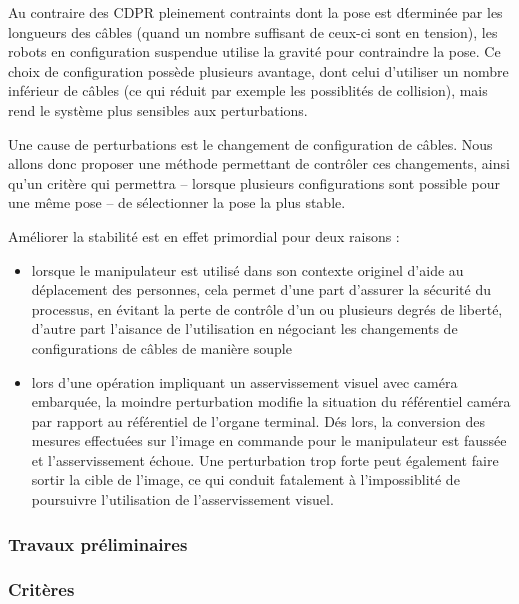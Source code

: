 Au contraire des CDPR pleinement contraints dont la pose est d\'termin\'ee par 
les longueurs des c\^ables (quand un nombre suffisant de ceux-ci sont en 
tension), les robots en configuration suspendue utilise la gravit\'e pour 
contraindre la pose. Ce choix de configuration poss\`ede plusieurs avantage, 
dont celui d'utiliser un nombre inf\'erieur de c\^ables (ce qui r\'eduit par 
exemple les possiblit\'es de collision), mais rend le syst\`eme plus sensibles 
aux perturbations.

Une cause de perturbations est le changement de configuration de c\^ables. Nous 
allons donc proposer une m\'ethode permettant de contr\^oler ces changements, 
ainsi qu'un crit\`ere qui permettra -- lorsque plusieurs configurations sont 
possible pour une m\^eme pose -- de s\'electionner la pose la plus stable.

Am\'eliorer la stabilit\'e est en effet primordial pour deux raisons :
\begin{itemize}
 \item lorsque le manipulateur est utilis\'e dans son contexte originel d'aide 
au d\'eplacement des personnes, cela permet d'une part d'assurer la 
s\'ecurit\'e du processus, en \'evitant la perte de contr\^ole d'un ou 
plusieurs degr\'es de libert\'e, d'autre part l'aisance de l'utilisation en 
n\'egociant les changements de configurations de c\^ables de mani\`ere souple
\item lors d'une op\'eration impliquant un asservissement visuel avec cam\'era 
embarqu\'ee, la moindre perturbation modifie la situation du r\'ef\'erentiel 
cam\'era par rapport au r\'ef\'erentiel de l'organe terminal. D\'es lors, la 
conversion des mesures effectu\'ees sur l'image en commande pour le 
manipulateur est fauss\'ee et l'asservissement \'echoue. Une perturbation trop 
forte peut \'egalement faire sortir la cible de l'image, ce qui conduit 
fatalement \`a l'impossiblit\'e de poursuivre l'utilisation de l'asservissement 
visuel.
\end{itemize}

\subsubsection{Travaux pr\'eliminaires}










\subsubsection{Crit\`eres}

